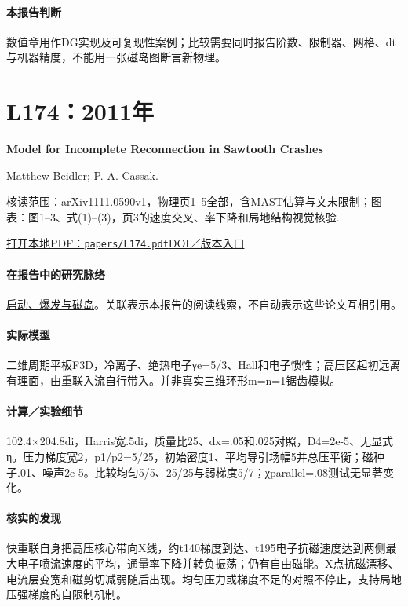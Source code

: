 \documentclass[UTF8,a4paper,11pt,openany,fontset=fandol]{ctexbook}
\begin{document}
\paragraph{本报告判断}数值章用作DG实现及可复现性案例；比较需要同时报告阶数、限制器、网格、dt与机器精度，不能用一张磁岛图断言新物理。

\section{L174：2011年}\label{paper:L174}

\textbf{Model for Incomplete Reconnection in Sawtooth Crashes}\citep{L174}\

Matthew Beidler;  P. A. Cassak.

\textsf{核读范围：}arXiv1111.0590v1，物理页1–5全部，含MAST估算与文末限制；\textsf{图表：}图1–3、式(1)–(3)，页3的速度交叉、率下降和局地结构视觉核验.

\href{run:../papers/L174.pdf}{打开本地PDF：\texttt{papers/L174.pdf}}\quad\href{https://doi.org/10.1103/physrevlett.107.255002}{DOI／版本入口}

\paragraph{在报告中的研究脉络}\hyperref[story:onset]{启动、爆发与磁岛}。关联表示本报告的阅读线索，不自动表示这些论文互相引用。

\paragraph{实际模型}二维周期平板F3D，冷离子、绝热电子γe=5/3、Hall和电子惯性；高压区起初远离有理面，由重联入流自行带入。并非真实三维环形m=n=1锯齿模拟。

\paragraph{计算／实验细节}102.4×204.8di，Harris宽.5di，质量比25、dx=.05和.025对照，D4=2e-5、无显式η。压力梯度宽2，p1/p2=5/25，初始密度1、平均导引场幅5并总压平衡；磁种子.01、噪声2e-5。比较均匀5/5、25/25与弱梯度5/7；χparallel=.08测试无显著变化。

\paragraph{核实的发现}快重联自身把高压核心带向X线，约t140梯度到达、t195电子抗磁速度达到两侧最大电子喷流速度的平均，通量率下降并转负振荡；仍有自由磁能。X点抗磁漂移、电流层变宽和磁剪切减弱随后出现。均匀压力或梯度不足的对照不停止，支持局地压强梯度的自限制机制。
\end{document}
